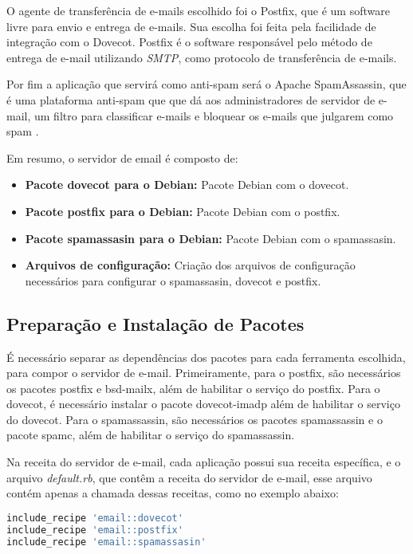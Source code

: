O agente de transferência de e-mails escolhido foi o Postfix, que é um software
livre para envio e entrega de e-mails. Sua escolha foi feita pela facilidade de
integração com o Dovecot. Postfix é o software responsável pelo método de entrega de e-mail
utilizando \textit{SMTP}, como protocolo de transferência de e-mails. 

Por fim a aplicação que servirá como anti-spam será o Apache SpamAssassin, que 
é uma plataforma anti-spam que que dá aos administradores de servidor de e-mail, 
um filtro para classificar e-mails e bloquear os e-mails que julgarem como spam \cite{spam}. 

Em resumo, o servidor de email é composto de:

\begin{itemize}
   \item \textbf{Pacote dovecot para o Debian:} Pacote Debian com o dovecot.
   \item \textbf{Pacote postfix para o Debian:} Pacote Debian com o postfix.
   \item \textbf{Pacote spamassasin para o Debian:} Pacote Debian com o spamassasin.
   \item \textbf{Arquivos de configuração:} Criação dos arquivos de configuração
   necessários para configurar o spamassasin, dovecot e postfix.
\end{itemize}

\subsection{Preparação e Instalação de Pacotes }

É necessário separar as dependências dos pacotes para cada ferramenta
escolhida, para compor o servidor de e-mail. Primeiramente, para o postfix, são necessários
os pacotes postfix e bsd-mailx, além de habilitar o serviço do postfix. Para o dovecot,
é necessário instalar o pacote dovecot-imadp além de habilitar o serviço do dovecot. 
Para o spamassassin, são necessários os pacotes spamassassin e o pacote spamc, além 
de habilitar o serviço do spamassassin.

Na receita do servidor de e-mail, cada aplicação possui sua receita específica,
e o arquivo \textit{default.rb}, que contêm a receita do servidor de e-mail, esse arquivo
contém apenas a chamada dessas receitas, como no exemplo abaixo:

\begin{lstlisting}[language=Ruby,label=dice_index,caption={Exemplo da receita de email
composta por outras receitas}]
include_recipe 'email::dovecot'
include_recipe 'email::postfix'
include_recipe 'email::spamassasin'
\end{lstlisting}

